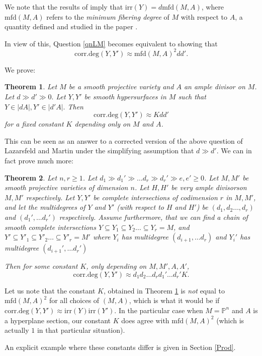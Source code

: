 \documentclass[12pt]{amsart}
\numberwithin{equation}{section}
\newtheorem{theorem}{Theorem}
\numberwithin{theorem}{section}
\theoremstyle{definition}
\theoremstyle{definition}
\def\PP{{\mathbb{P}}}
\newcommand{\cd}{\textrm{corr.deg}}
\newcommand{\irr}{\textrm{irr}}
\begin{document}
We note that the results of \cite{LUS} imply that $\irr(Y) = d \textrm{mfd}(M,A)$, where $\textrm{mfd}(M,A)$ refers to the \emph{minimum fibering degree} of $M$ with respect to $A$,  a quantity defined  and studied in the paper \cite{LUS}.

In view of this, Question \ref{qnLM} becomes equivalent to showing that   $$\cd(Y,Y') \approx \textrm{mfd}(M,A)^2 dd'.$$

We prove:
\begin{theorem}\label{hypvers}
    Let $M$ be a smooth projective variety and $A$ an ample divisor on $M$. Let $d \gg d' \gg 0.$ Let $Y, Y'$ be  smooth hypersurfaces in $M$ such that $Y \in |dA|, Y' \in |d' A|.$
    Then $$\cd(Y,Y') \approx Kdd'$$ for a fixed constant $K$ depending only on $M$ and $A$.
\end{theorem}
This can be seen as an answer to a corrected version of the above question of Lazarsfeld and Martin under the simplifying assumption that $d \gg d'.$
We can in fact prove much more:

\begin{theorem}\label{unbancorrdeg}
     Let $n,r \ge 1$.
     Let  $d_1 \gg d_1' \gg \dots d_r \gg d_r' \gg e, e' \ge 0$.
     Let $M, M'$ be smooth projective varieties of dimension $n$. Let $H, H'$ be very ample divisorson $M, M'$ respectively. Let $Y, Y'$ be complete intersections of codimension $r$ in $M, M'$, and let  the multidegrees of $Y$ and $Y'$  (with respect to $H$ and $H'$) be $(d_1, d_2 \dots, d_r)$ and $(d_1' ,\dots d_r')$ respectively. Assume furthermore, that we can find a chain of smooth complete intersections $Y \subseteq Y_1 \subseteq Y_2 \dots \subseteq Y_r = M $, and $Y' \subseteq Y'_1 \subseteq Y'_2 \dots \subseteq Y'_r = M' $ where $Y_i$ has multidegree $(d_{i+1}, \dots d_r)$ and $Y_i'$ has multidegree $(d_{i+1}', \dots d_r')$
    
    
     Then for some constant $K$, only depending on $M, M', A, A'$, $$\cd(Y,Y') \approx d_1 d_2 \dots d_r d_1' \dots d_r' K .$$
\end{theorem}

Let us note that the constant $K$, obtained in Theorem \ref{hypvers} is \emph{not}  equal to $\textrm{mfd} (M,A)^2$ for all choices of $(M,A)$, which is what it would be if $\cd(Y,Y') \approx  \irr(Y)\irr(Y').$ In the particular case when $M = \PP^n$ and $A$ is a hyperplane section,  our constant $K$ does agree with $\textrm{mfd}(M,A)^2$ (which is actually $1$ in that particular situation).

An explicit example where these constants differ is given in Section \ref{Prod}.
\end{document}
